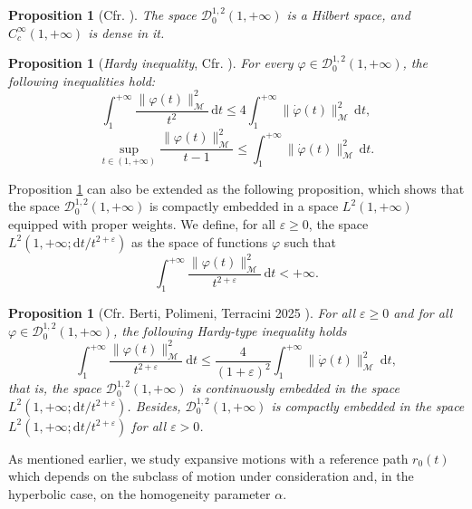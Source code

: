 \documentclass[a4paper,10pt]{amsart}
\newcommand{\ud}{\mathrm{d}}
\theoremstyle{plain}
\newtheorem{prop}[thm]{Proposition}
\theoremstyle{definition}
\numberwithin{equation}{section}
\numberwithin{thm}{section}
\begin{document}
\begin{prop}[Cfr. \cite{BDFT}]
The space $\mathcal{D}_0^{1,2}(1,+\infty)$ is a Hilbert space, and $C_c^\infty(1, +\infty)$ is dense in it.
\end{prop}

\begin{prop}[\textit{Hardy inequality}, Cfr. \cite{BDFT}]\label{dis_hardy}
For every $\varphi \in \mathcal{D}_0^{1,2}(1, +\infty)$, the following inequalities hold:
\begin{displaymath}
    \int_1^{+\infty} \frac{\|\varphi(t)\|_\mathcal{M}^2}{t^2}\, \mathrm{d}t \leq 4 \int_1^{+\infty} \|\dot{\varphi}(t)\|_\mathcal{M}^2\, \mathrm{d}t,
\end{displaymath}
\begin{equation}\label{dis_space_D012}
    \sup_{t \in (1,+\infty)} \frac{\|\varphi(t)\|_\mathcal{M}^2}{t - 1} \leq \int_1^{+\infty} \|\dot{\varphi}(t)\|_\mathcal{M}^2\, \mathrm{d}t.
\end{equation}
\end{prop}

Proposition \ref{dis_hardy} can also be extended as the following proposition, which shows that the space $\mathcal{D}_0^{1,2}(1,+\infty)$ is compactly embedded in a space $L^2(1,+\infty)$ equipped with proper weights. 
We define, for all $\varepsilon\ge 0$, the space $L^2(1,+\infty;\ud t/t^{2+\varepsilon})$ as the space of functions $\varphi$ such that
\[
\int_1^{+\infty} \frac{\|\varphi(t)\|_{\mathcal{M}}^2}{t^{2+\varepsilon}}\, \ud t < +\infty.
\]

\begin{prop}[Cfr. Berti, Polimeni, Terracini 2025 \cite{BertiPolimeniTerracini}]
\label{prop:compact_emb}
    For all $\varepsilon \ge0$ and for all $\varphi\in\mathcal{D}_0^{1,2}(1,+\infty)$, the following Hardy-type inequality holds
    \begin{equation}\label{hardy_compact}
        \int_{1}^{+\infty} \frac{\|\varphi(t)\|_\mathcal{M}^2}{t^{2+\varepsilon}}\ \ud t \leq \frac{4}{(1+\varepsilon)^2} \int_{1}^{+\infty} \|\dot{\varphi}(t)\|_\mathcal{M}^2\ \ud t,
    \end{equation}
    that is, the space $\mathcal{D}_0^{1,2}(1,+\infty)$ is continuously embedded in the space $L^2(1,+\infty;\ud t/t^{2+\varepsilon})$. Besides, $\mathcal{D}_0^{1,2}(1,+\infty)$ is compactly embedded in the space $L^2(1,+\infty; \ud t/t^{2+\varepsilon})$ for all $\varepsilon>0$.
\end{prop}

As mentioned earlier, we study expansive motions with a reference path $r_0(t)$ which depends on the subclass of motion under consideration and, in the hyperbolic case, on the homogeneity parameter $\alpha$.
\end{document}
